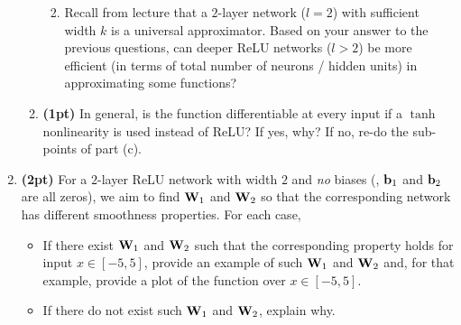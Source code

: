 \documentclass[12pt,letterpaper]{article}
\begin{document}
\begin{enumerate}
\begin{enumerate}
\begin{enumerate}
           
           \item Recall from lecture that a $2$-layer network ($l=2$) with sufficient width $k$ is a universal approximator. Based on your answer to the previous questions, can deeper ReLU networks ($l > 2$) be more efficient (in terms of total number of neurons / hidden units) in approximating some functions? 
           
       \end{enumerate}
       
        \item \textbf{(1pt)} In general, is the function differentiable at every input if a $\tanh$ nonlinearity is used instead of ReLU? If yes, why? If no, re-do the sub-points of part (c). 
       
   \end{enumerate}
   
   \item \textbf{(2pt)} For a $2$-layer ReLU network with width $2$ and \emph{no} biases (\ie, ${\mathbf{b}}_1$ and ${\mathbf{b}}_2$ are all zeros), we aim to find ${\mathbf{W}}_1$ and ${\mathbf{W}}_2$ so that the corresponding network has different smoothness properties. For each case, \begin{itemize}
       \item If there exist ${\mathbf{W}}_1$ and ${\mathbf{W}}_2$ such that the corresponding property holds for input $x 
       \in [-5, 5]$, 
       provide an example of such
       ${\mathbf{W}}_1$ and ${\mathbf{W}}_2$ 
       and, for that example,
       provide a plot of the function over $x \in [-5, 5]$.
       
       \item If there do not exist such ${\mathbf{W}}_1$ and ${\mathbf{W}}_2$, explain why.
   \end{itemize} 
   

\end{enumerate}
\end{document}
